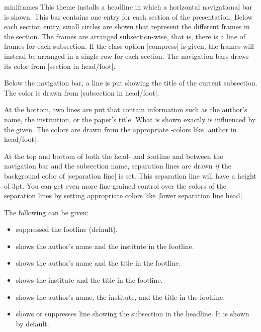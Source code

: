 \begin{outerthemeexample}{miniframes}
  This theme installs a headline in which a horizontal navigational
  bar is shown. This bar contains one entry for each section of the
  presentation. Below each section entry, small circles are shown that
  represent the different frames in the section. The frames are
  arranged subsection-wise, that is, there is a line of frames for
  each subsection. If the class  option |compress| is given, the
  frames will instead be arranged in a single row for each
  section. The navigation bars draws its color from
  |section in head/foot|.

  Below the navigation bar, a line is put showing the title of the
  current subsection. The color is drawn from |subsection in head/foot|.

  At the bottom, two lines are put that contain information such as
  the author's name, the institution, or the paper's title. What is
  shown exactly is influenced by the  given. The colors
  are drawn from the appropriate \beamer-colors like
  |author in head/foot|.

  At the top and bottom of both the head- and footline and between the
  navigation bar and the subsection name, separation lines are drawn
  \emph{if} the background color of |separation line| is set. This
  separation line will have a height of 3pt. You can get even more
  fine-grained control over the colors of the separation lines by
  setting appropriate colors like |lower separation line head|.

  The following  can be given:
  \begin{itemize}
  \item {} suppressed the footline (default).
  \item {} shows the author's name
    and the institute in the footline.
  \item {} shows the author's name
    and the title in the footline.
  \item {} shows the institute
    and the title in the footline.
  \item {} shows the author's
    name, the institute, and the title in the footline.
  \item {} shows or suppresses
    line showing the subsection in the headline. It is shown by
    default.
  \end{itemize}  
\end{outerthemeexample}

